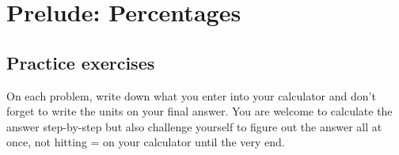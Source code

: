 
\section{Prelude: Percentages} 

\subsection*{Practice exercises}

On each problem, write down what you enter into your calculator and don't forget to write the units on your final answer. You are welcome to calculate the answer step-by-step but also challenge yourself to figure out the answer all at once, not hitting = on your calculator until the very end.


%
%
%

